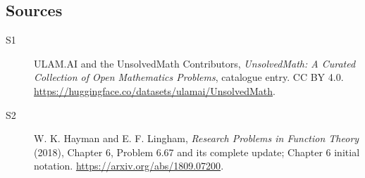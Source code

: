 \documentclass[11pt]{article}
\begin{document}
\subsection{Sources}
\begin{description}
\item[\hypertarget{source:statement:1}{S1}] ULAM.AI and the UnsolvedMath Contributors, \emph{UnsolvedMath: A Curated Collection of Open Mathematics Problems}, catalogue entry. CC BY 4.0. \url{https://huggingface.co/datasets/ulamai/UnsolvedMath}.
\item[\hypertarget{source:statement:2}{S2}] W. K. Hayman and E. F. Lingham, \emph{Research Problems in Function Theory} (2018), Chapter 6, Problem 6.67 and its complete update; Chapter 6 initial notation. \url{https://arxiv.org/abs/1809.07200}.
\end{description}
\label{end:statement}
\end{document}
